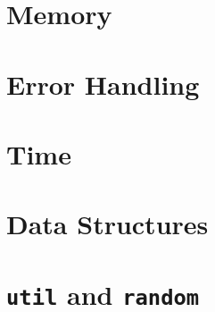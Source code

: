 %
% 
% 
\def\FileCreated{Fri Jun 22 19:33:30 2001}
\def\FileRevised{Sat Jun 23 04:05:49 2001}

\section{Memory}
\label{sec:memory}

\section{Error Handling}
\label{sec:errorhandling}

\section{Time}
\label{sec:time}

\section{Data Structures}
\label{sec:datastructures}

\section{{\tt util} and {\tt random}}
\label{sec:util}
